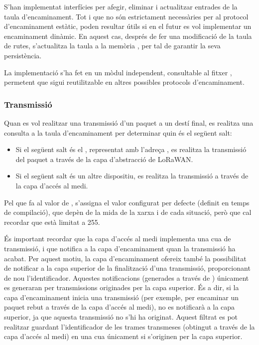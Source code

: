 \documentclass{tfgitic}[2024/07/01]
\begin{document}
{S'han implementat interfícies per afegir, eliminar i actualitzar entrades de la taula d'encaminament. Tot i que no són estrictament necessàries per al protocol d'encaminament estàtic, poden resultar útils si en el futur es vol implementar un encaminament dinàmic. En aquest cas, després de fer una modificació de la taula de rutes, s'actualitza la taula a la memòria , per tal de garantir la seva persistència.

La implementació s'ha fet en un mòdul independent, consultable al fitxer , permetent que sigui reutilitzable en altres possibles protocols d'encaminament.
\subsubsection{Transmissió}
\label{subsubsec:routing_tx}
Quan es vol realitzar una transmissió d'un paquet a un destí final, es realitza una consulta a la taula d'encaminament per determinar quin és el següent salt:
\begin{itemize}
    \item Si el següent salt és el , representat amb l'adreça , es realitza la transmissió del paquet a través de la capa d'abstracció de LoRaWAN.
    \item Si el següent salt és un altre dispositiu, es realitza la transmissió a través de la capa d'accés al medi.
\end{itemize}

Pel que fa al valor de , s'assigna el valor configurat per defecte (definit en temps de compilació), que depèn de la mida de la xarxa i de cada situació, però que cal recordar que està limitat a 255.

És important recordar que la capa d'accés al medi implementa una cua de transmissió, i que notifica a la capa d'encaminament quan la transmissió ha acabat. Per aquest motiu, la capa d'encaminament ofereix també la possibilitat de notificar a la capa superior de la finalització d'una transmissió, proporcionant de nou l'identificador. Aquestes notificacions (generades a través de ) únicament es generaran per transmissions originades per la capa superior. És a dir, si la capa d'encaminament inicia una transmissió (per exemple, per encaminar un paquet rebut a través de la capa d'accés al medi), no es notificarà a la capa superior, ja que aquesta transmissió no s'hi ha originat. Aquest filtrat es pot realitzar guardant l'identificador de les trames transmeses (obtingut a través de la capa d'accés al medi) en una cua únicament si s'originen per la capa superior.

}
\end{document}
